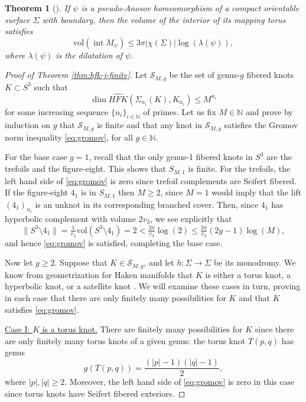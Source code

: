 \documentclass[11pt]{amsart}
\newtheorem {theorem}{Theorem}
\numberwithin{equation}{section}
\numberwithin{theorem}{section}
\theoremstyle{definition}
\newcommand\HFK{\widehat{\mathit{HFK}}}
\newcommand{\inr}{\operatorname{int}}
\begin{document}
\begin{theorem}[{\cite[Theorem 1.1]{kojima-mcshane}}] \label{thm:kj}
If $\psi$ is a pseudo-Anosov homeomorphism of a compact orientable surface $\Sigma$ with boundary, then the volume of the interior of its mapping torus satisfies \[\mathrm{vol}(\inr M_\psi) \leq 3\pi|\chi(\Sigma)|\log(\lambda(\psi)),\] where $\lambda(\psi)$ is the dilatation of $\psi$.
\end{theorem}

\begin{proof}[Proof of Theorem \ref{thm:hfk-j-finite}]
Let $\mathcal{S}_{M,g}$ be the set of genus-$g$ fibered knots $K\subset S^3$ such that \[\dim\HFK(\Sigma_{n_i}(K),K_{n_i})\leq M^{n_i}\] for some increasing sequence $\{n_i\}_{i\in\mathbb{N}}$ of  primes. Let us fix $M\in \mathbb{N}$ and prove by induction on $g$ that $\mathcal{S}_{M,g}$ is finite and that any knot in $\mathcal{S}_{M,g}$ satisfies the Gromov norm inequality \eqref{eq:gromov}, for all $g\in \mathbb{N}$.

For the base case $g=1$, recall that the only genus-1 fibered knots in $S^3$ are the trefoils and the figure-eight. This shows that $S_{M,1}$ is finite. For the trefoils, the left hand side of \eqref{eq:gromov} is zero since trefoil complements are Seifert fibered. If the figure-eight $4_1$ is in $S_{M,1}$ then $M\geq 2$, since $M=1$ would imply that the lift $(4_1)_{n_i}$ is an unknot in its corresponding branched cover. Then, since $4_1$ has hyperbolic complement with volume $2v_3$, we see explicitly that \[\lVert S^3\setminus 4_1\rVert = \tfrac{1}{v_3}\mathrm{vol}(S^3\setminus 4_1) = 2< \tfrac{3\pi}{v_3}\log(2) \leq \tfrac{3\pi}{v_3}(2g-1)\log(M),\] and hence \eqref{eq:gromov} is satisfied, completing the base case.
 
Now let $g\geq 2$. Suppose that $K\in \mathcal{S}_{M,g}$, and let $h:\Sigma\to \Sigma$ be its monodromy. We know from geometrization for Haken manifolds that $K$ is either a torus knot, a hyperbolic knot, or a satellite knot \cite[Corollary 2.5]{thurston-kleinian}. We will examine these cases in turn, proving in each case that there are only finitely many possibilities for $K$ and that $K$ satisfies \eqref{eq:gromov}.

\vspace{1em}\noindent
\underline{Case I: $K$ is a torus knot.} There are finitely many possibilities for $K$ since there are only finitely many torus knots of a given genus: the torus knot $T(p,q)$ has genus \[g(T(p,q)) = \frac{(|p|-1)(|q|-1)}{2},\] where $|p|,|q| \geq 2$. Moreover, the left hand side of \eqref{eq:gromov} is zero in this case since torus knots have Seifert fibered exteriors.


\end{proof}
\end{document}
